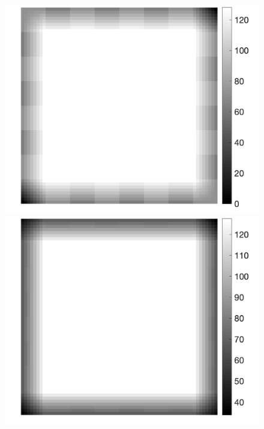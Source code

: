 \documentclass[fleqn,a4paper,oneside,openany]{book}
\begin{document}
\begin{figure}[!t] 
\centering
   \begin{minipage}[b]{0.45\textwidth} 
     \centering
     \includegraphics[trim = 0 0 0 0, clip,scale=0.40]{example_1a1_outlier.png}
   \end{minipage}
   \begin{minipage}[b]{0.45\textwidth}
     \centering
     \includegraphics[trim = 0 0 0 0, clip, scale=0.40]{example_1a1_crm.png}

\end{minipage}
\end{figure}
\end{document}

